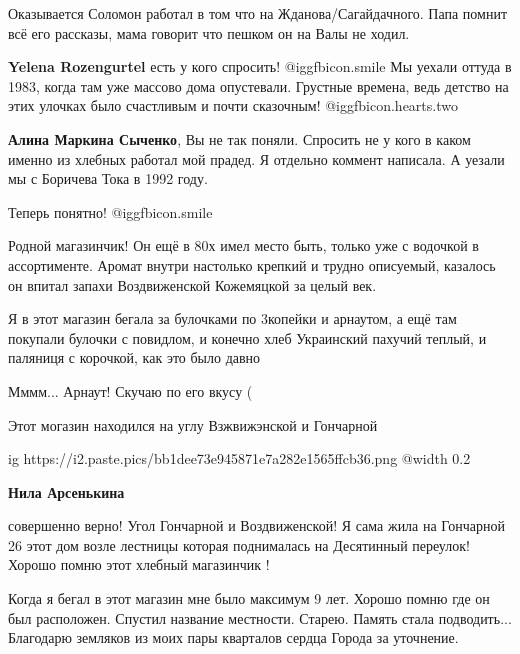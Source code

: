 
Оказывается Соломон работал в том что на Жданова/Сагайдачного. Папа помнит всё
его рассказы, мама говорит что пешком он на Валы не ходил.

\textbf{Yelena Rozengurtel} есть у кого спросить! @igg{fbicon.smile} 
Мы уехали оттуда в 1983, когда там уже массово дома опустевали.
Грустные времена, ведь детство на этих улочках было счастливым и почти сказочным! @igg{fbicon.hearts.two} 

\textbf{Алина Маркина Сыченко}, Вы не так поняли. Спросить не у кого в каком именно из хлебных работал мой прадед. Я отдельно коммент написала. А уезали мы с Боричева Тока в 1992 году.

Теперь понятно! @igg{fbicon.smile} 

Родной магазинчик!
Он ещё в 80х имел место быть, только уже с водочкой в ассортименте.
Аромат внутри настолько крепкий и трудно описуемый, казалось он впитал запахи Воздвиженской Кожемяцкой за целый век.


Я в этот магазин бегала за булочками по 3копейки и арнаутом, а ещё там покупали
булочки с повидлом, и конечно хлеб Украинский пахучий теплый, и паляниця с
корочкой, как это было давно


Мммм... Арнаут! Скучаю по его вкусу (

Этот могазин находился на углу Взжвижэнской и Гончарной

\ifcmt
  ig https://i2.paste.pics/bb1dee73e945871e7a282e1565ffcb36.png
  @width 0.2
\fi

\textbf{Нила Арсенькина} 

совершенно верно! Угол Гончарной и Воздвиженской! Я сама жила на Гончарной 26
этот дом возле лестницы которая поднималась на Десятинный переулок! Хорошо
помню этот хлебный магазинчик !


Когда я бегал в этот магазин мне было максимум 9 лет. Хорошо помню где он был
расположен. Спустил название местности. Старею. Память стала подводить...
Благодарю земляков из моих пары кварталов сердца Города за уточнение.
